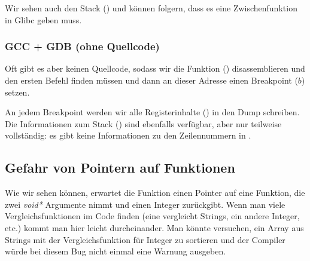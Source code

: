 Wir sehen auch den Stack () und können folgern, dass es eine Zwischenfunktion  in Glibc
geben muss.



\subsubsection{GCC + GDB (ohne Quellcode)}
Oft gibt es aber keinen Quellcode, sodass wir die \comp Funktion () disassemblieren und den ersten \CMP Befehl
finden müssen und dann an dieser Adresse einen Breakpoint ($b$) setzen.

An jedem Breakpoint werden wir alle Registerinhalte () in den Dump schreiben.
Die Informationen zum Stack () sind ebenfalls verfügbar, aber nur teilweise vollständig: es gibt keine
Informationen zu den Zeilennummern in \comp.



\subsection{Gefahr von Pointern auf Funktionen}
Wie wir sehen können, erwartet die Funktion \qsort einen Pointer auf eine Funktion, die zwei \emph{void*} Argumente nimmt
und einen Integer zurückgibt.
Wenn man viele Vergleichsfunktionen im Code finden (eine vergleicht Strings, ein andere Integer, etc.) kommt man hier
leicht durcheinander.
Man könnte versuchen, ein Array aus Strings mit der Vergleichsfunktion für Integer zu sortieren und der Compiler würde
bei diesem Bug nicht einmal eine Warnung ausgeben.
